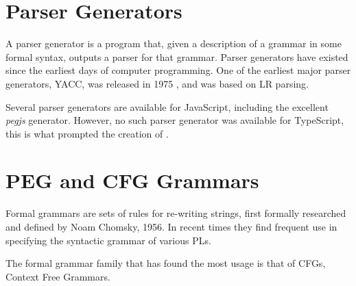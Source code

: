 \section{Parser Generators}

A parser generator is a program that, given a description of a grammar in some formal syntax, outputs a parser for that grammar. Parser generators have existed since the earliest days of computer programming. One of the earliest major parser generators, YACC, was released in 1975 \cite{yacc}, and was based on LR parsing.

Several parser generators are available for JavaScript, including the excellent \emph{pegjs} generator. However, no such parser generator was available for TypeScript, this is what prompted the creation of \tsPEG{}.

\section{PEG and CFG Grammars}

Formal grammars are sets of rules for re-writing strings, first formally researched and defined by Noam Chomsky, 1956\cite{chomskypaper}. In recent times they find frequent use in specifying the syntactic grammar of various PLs.

The formal grammar family that has found the most usage is that of CFGs, Context Free Grammars.
